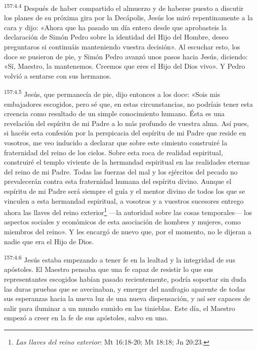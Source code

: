 \par
\textsuperscript{157:4.4} Después de haber compartido el almuerzo y de haberse puesto a discutir los planes de su próxima gira por la Decápolis, Jesús los miró repentinamente a la cara y dijo: «Ahora que ha pasado un día entero desde que aprobasteis la declaración de Simón Pedro sobre la identidad del Hijo del Hombre, deseo preguntaros si continuáis manteniendo vuestra decisión». Al escuchar esto, los doce se pusieron de pie, y Simón Pedro avanzó unos pasos hacia Jesús, diciendo: «Sí, Maestro, la mantenemos. Creemos que eres el Hijo del Dios vivo». Y Pedro volvió a sentarse con sus hermanos.

\par
\textsuperscript{157:4.5} Jesús, que permanecía de pie, dijo entonces a los doce: «Sois mis embajadores escogidos, pero sé que, en estas circunstancias, no podríais tener esta creencia como resultado de un simple conocimiento humano. Ésta es una revelación del espíritu de mi Padre a lo más profundo de vuestra alma. Así pues, si hacéis esta confesión por la perspicacia del espíritu de mi Padre que reside en vosotros, me veo inducido a declarar que sobre este cimiento construiré la fraternidad del reino de los cielos. Sobre esta roca de realidad espiritual, construiré el templo viviente de la hermandad espiritual en las realidades eternas del reino de mi Padre. Todas las fuerzas del mal y los ejércitos del pecado no prevalecerán contra esta fraternidad humana del espíritu divino. Aunque el espíritu de mi Padre será siempre el guía y el mentor divino de todos los que se vinculen a esta hermandad espiritual, a vosotros y a vuestros sucesores entrego ahora las llaves del reino exterior\footnote{\textit{Las llaves del reino exterior}: Mt 16:18-20; Mt 18:18; Jn 20:23.} ---la autoridad sobre las cosas temporales--- los aspectos sociales y económicos de esta asociación de hombres y mujeres, como miembros del reino». Y les encargó de nuevo que, por el momento, no le dijeran a nadie que era el Hijo de Dios.

\par
\textsuperscript{157:4.6} Jesús estaba empezando a tener fe en la lealtad y la integridad de sus apóstoles. El Maestro pensaba que una fe capaz de resistir lo que sus representantes escogidos habían pasado recientemente, podría soportar sin duda las duras pruebas que se avecinaban, y emerger del naufragio aparente de todas sus esperanzas hacia la nueva luz de una nueva dispensación, y así ser capaces de salir para iluminar a un mundo sumido en las tinieblas. Este día, el Maestro empezó a creer en la fe de sus apóstoles, salvo en uno.

